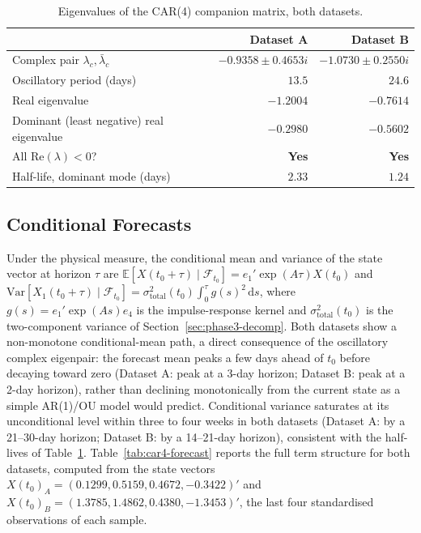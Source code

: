 \begin{table}[htbp]
\centering
\caption{Eigenvalues of the CAR(4) companion matrix, both datasets.}
\label{tab:car4-eigen}
\begin{tabular}{l r r}
\toprule
& \textbf{Dataset A} & \textbf{Dataset B} \\
\midrule
Complex pair $\lambda_{c},\bar\lambda_{c}$ & $-0.9358 \pm 0.4653i$ & $-1.0730 \pm 0.2550i$ \\
Oscillatory period (days) & $13.5$ & $24.6$ \\
Real eigenvalue & $-1.2004$ & $-0.7614$ \\
Dominant (least negative) real eigenvalue & $-0.2980$ & $-0.5602$ \\
All $\mathrm{Re}(\lambda) < 0$? & \textbf{Yes} & \textbf{Yes} \\
Half-life, dominant mode (days) & $2.33$ & $1.24$ \\
\bottomrule
\end{tabular}
\end{table}

\subsection{Conditional Forecasts}
\label{sec:phase4-forecast}

Under the physical measure, the conditional mean and variance of the state vector at horizon $\tau$ are $\mathbb E[X(t_0+\tau)\mid\mathcal F_{t_0}] = e_1' \exp(A\tau) X(t_0)$ and $\mathrm{Var}[X_1(t_0+\tau)\mid\mathcal F_{t_0}] = \sigma^2_{\text{total}}(t_0)\int_0^\tau g(s)^2\,\mathrm ds$, where $g(s) = e_1'\exp(As)e_4$ is the impulse-response kernel and $\sigma^2_{\text{total}}(t_0)$ is the two-component variance of Section~\ref{sec:phase3-decomp}. Both datasets show a non-monotone conditional-mean path, a direct consequence of the oscillatory complex eigenpair: the forecast mean peaks a few days ahead of $t_0$ before decaying toward zero (Dataset A: peak at a 3-day horizon; Dataset B: peak at a 2-day horizon), rather than declining monotonically from the current state as a simple AR(1)/OU model would predict. Conditional variance saturates at its unconditional level within three to four weeks in both datasets (Dataset A: by a 21--30-day horizon; Dataset B: by a 14--21-day horizon), consistent with the half-lives of Table~\ref{tab:car4-eigen}. Table~\ref{tab:car4-forecast} reports the full term structure for both datasets, computed from the state vectors $X(t_0)_A = (0.1299, 0.5159, 0.4672, -0.3422)'$ and $X(t_0)_B = (1.3785, 1.4862, 0.4380, -1.3453)'$, the last four standardised observations of each sample.

